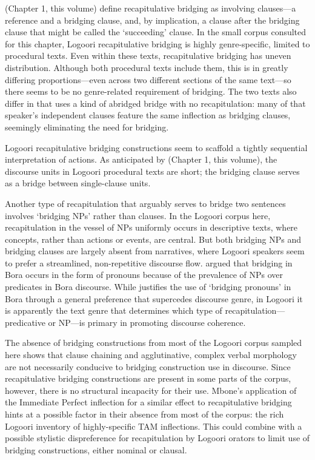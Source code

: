\documentclass[output=paper]{LSP/langsci}
\begin{document}
\citeauthor{guerin18} (Chapter 1, this volume) define recapitulative bridging as involving clauses—a reference and a bridging clause, and, by implication, a clause after the bridging clause that might be called the `succeeding' clause. In the small corpus consulted for this chapter, Logoori recapitulative bridging is highly genre-specific, limited to procedural texts. Even within these texts, recapitulative bridging has uneven distribution. Although both procedural texts include them, this is in greatly differing proportions—even across two different sections of the same text—so there seems to be no genre-related requirement of bridging. The two texts also differ in that \citet{Mbone2014} uses a kind of abridged bridge with no recapitulation: many of that speaker’s independent clauses feature the same inflection as bridging clauses, seemingly eliminating the need for bridging.

Logoori recapitulative bridging constructions seem to scaffold a tightly sequential interpretation of actions. As anticipated by \citeauthor{guerin18} (Chapter 1, this volume), the discourse units in Logoori procedural texts are short; the bridging clause serves as a bridge between single-clause units. 

Another type of recapitulation that arguably serves to bridge two sentences involves `bridging NPs' rather than clauses. In the Logoori corpus here, recapitulation in the vessel of NPs uniformly occurs in descriptive texts, where concepts, rather than actions or events, are central. But both bridging NPs and bridging clauses are largely absent from narratives, where Logoori speakers seem to prefer a streamlined, non-repetitive discourse flow. \citet{seifart10} argued that bridging in Bora occurs in the form of pronouns because of the prevalence of NPs over predicates in Bora discourse. While \citet{seifart10} justifies the use of `bridging pronouns' in Bora through a general preference that supercedes discourse genre, in Logoori it is apparently the text genre that determines which type of recapitulation—predicative or NP—is primary in promoting discourse coherence.

The absence of bridging constructions from most of the Logoori corpus sampled here shows that clause chaining and agglutinative, complex verbal morphology are not necessarily conducive to bridging construction use in discourse. Since recapitulative bridging constructions are present in some parts of the corpus, however, there is no structural incapacity for their use. Mbone’s application of the Immediate Perfect inflection for a similar effect to recapitulative bridging hints at a possible factor in their absence from most of the corpus: the rich Logoori inventory of highly-specific TAM inflections. This could combine with a possible stylistic dispreference for recapitulation by Logoori orators to limit use of bridging constructions, either nominal or clausal.
\end{document}
